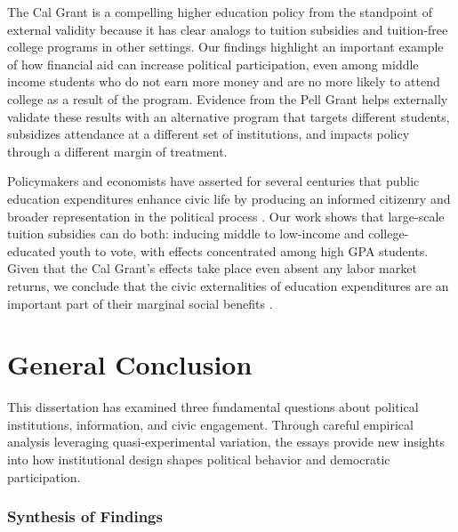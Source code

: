 \documentclass[12pt,letterpaper,oneside]{book}
\begin{document}
The Cal Grant is a compelling higher education policy from the standpoint of external validity because it has clear analogs to tuition subsidies and tuition-free college programs in other settings. Our findings highlight an important example of how financial aid can increase political participation, even among middle income students who do not earn more money and are no more likely to attend college as a result of the program. Evidence from the Pell Grant helps externally validate these results with an alternative program that targets different students, subsidizes attendance at a different set of institutions, and impacts policy through a different margin of treatment.

Policymakers and economists have asserted for several centuries that public education expenditures enhance civic life by producing an informed citizenry and broader representation in the political process \citep{mann_republic_1957,friedman_capitalism_2020}. Our work shows that large-scale tuition subsidies can do both: inducing middle to low-income and college-educated youth to vote, with effects concentrated among high GPA students. Given that the Cal Grant's effects take place even absent any labor market returns, we conclude that the civic externalities of education expenditures are an important part of their marginal social benefits \citep{finkelstein_welfare_2020,hendren_unified_2020}.

\chapter*{General Conclusion}
\label{sec:general-conclusion}

This dissertation has examined three fundamental questions about political institutions, information, and civic engagement. Through careful empirical analysis leveraging quasi-experimental variation, the essays provide new insights into how institutional design shapes political behavior and democratic participation.

\subsection*{Synthesis of Findings}
\end{document}
